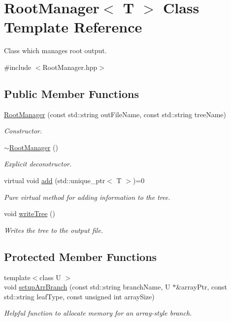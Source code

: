 \hypertarget{class_root_manager}{}\section{Root\+Manager$<$ T $>$ Class Template Reference}
\label{class_root_manager}


Class which manages root output.  




{\ttfamily \#include $<$Root\+Manager.\+hpp$>$}

\subsection*{Public Member Functions}
\begin{DoxyCompactItemize}
\item 
\hyperlink{class_root_manager_a152803255b94d68cbe4c4f8e24fc2352}{Root\+Manager} (const std\+::string out\+File\+Name, const std\+::string tree\+Name)
\begin{DoxyCompactList}\small\item\em Constructor. \end{DoxyCompactList}\item 
\hyperlink{class_root_manager_a68a189a7705b9da1da82a95ef9840d61}{$\sim$\+Root\+Manager} ()
\begin{DoxyCompactList}\small\item\em Explicit deconstructor. \end{DoxyCompactList}\item 
virtual void \hyperlink{class_root_manager_a2f05eb45d5eaee1f9f12e299395652fb}{add} (std\+::unique\+\_\+ptr$<$ T $>$)=0
\begin{DoxyCompactList}\small\item\em Pure virtual method for adding information to the tree. \end{DoxyCompactList}\item 
void \hyperlink{class_root_manager_adbe916dd56e5ec51f89c7643c4847842}{write\+Tree} ()
\begin{DoxyCompactList}\small\item\em Writes the tree to the output file. \end{DoxyCompactList}\end{DoxyCompactItemize}
\subsection*{Protected Member Functions}
\begin{DoxyCompactItemize}
\item 
{\footnotesize template$<$class U $>$ }\\void \hyperlink{class_root_manager_aa1eaed1aa026059b8d00e729161c6a43}{setup\+Arr\+Branch} (const std\+::string branch\+Name, U $\ast$\&array\+Ptr, const std\+::string leaf\+Type, const unsigned int array\+Size)
\begin{DoxyCompactList}\small\item\em Helpful function to allocate memory for an array-\/style branch. \end{DoxyCompactList}\end{DoxyCompactItemize}
